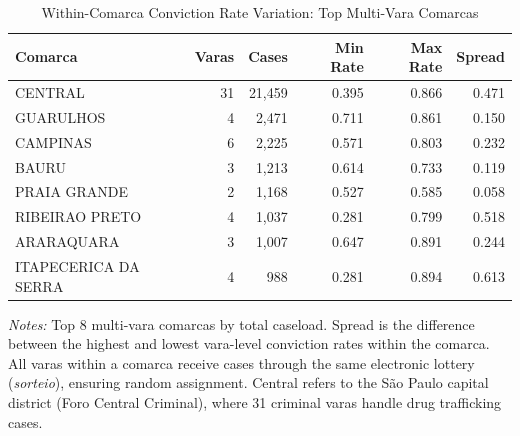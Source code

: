 \begin{table}[htbp]
\centering
\caption{Within-Comarca Conviction Rate Variation: Top Multi-Vara Comarcas}
\label{tab:within_comarca}
\begin{tabular}{lrrrrr}
\toprule
Comarca & Varas & Cases & Min Rate & Max Rate & Spread \\
\midrule
CENTRAL & 31 & 21,459 & 0.395 & 0.866 & 0.471 \\
GUARULHOS & 4 & 2,471 & 0.711 & 0.861 & 0.150 \\
CAMPINAS & 6 & 2,225 & 0.571 & 0.803 & 0.232 \\
BAURU & 3 & 1,213 & 0.614 & 0.733 & 0.119 \\
PRAIA GRANDE & 2 & 1,168 & 0.527 & 0.585 & 0.058 \\
RIBEIRAO PRETO & 4 & 1,037 & 0.281 & 0.799 & 0.518 \\
ARARAQUARA & 3 & 1,007 & 0.647 & 0.891 & 0.244 \\
ITAPECERICA DA SERRA & 4 & 988 & 0.281 & 0.894 & 0.613 \\
\bottomrule
\end{tabular}
\begin{flushleft}\small
\textit{Notes:} Top 8 multi-vara comarcas by total caseload. Spread is the difference between the highest and lowest vara-level conviction rates within the comarca. All varas within a comarca receive cases through the same electronic lottery (\textit{sorteio}), ensuring random assignment. Central refers to the São Paulo capital district (Foro Central Criminal), where 31 criminal varas handle drug trafficking cases.
\end{flushleft}
\end{table}